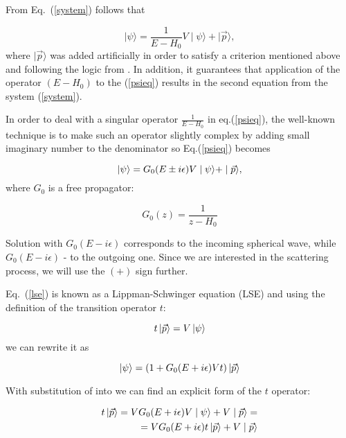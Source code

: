     From Eq.~(\ref{system}) follows that

    \begin{equation}
        \mid \psi \rangle = \frac{1}{E - H_0}V \mid \psi \rangle +  \mid \vec{p} \rangle,
        \label{psieq}
    \end{equation}
    where $\mid \vec{p} \rangle$ was added artificially in order to satisfy a criterion mentioned above 
    and following the logic from \cite{Sakurai}. In addition, it guarantees that
     application of the operator $(E -H_0)$ to the 
    (\ref{psieq}) results in the second equation from the system (\ref{system}).

    In order to deal with a singular operator $\frac{1}{E - H_0}$ in eq.(\ref{psieq}), the well-known
    technique is to make such an operator slightly complex by adding small imaginary number to the denominator
    so Eq.(\ref{psieq}) becomes

    \begin{equation}
        \ket{\psi} = G_0(E \pm i\epsilon)V \mid \psi \rangle +  \mid \vec{p} \rangle,
        \label{lse}
    \end{equation}
    where $G_0$ is a free propagator:

    \begin{equation}
        G_0(z) = \frac{1}{z - H_0}
    \end{equation}

    Solution with $G_0(E - i\epsilon)$ corresponds to the incoming spherical wave,
    while $G_0(E - i\epsilon)$ - to the outgoing one. Since we are interested in the scattering
    process, we will use the $(+)$ sign further.
    
    Eq.~(\ref{lse}) is known as a Lippman-Schwinger equation (LSE) and using
    the definition of the transition operator $t$:

    \begin{equation}
        t \ket{\vec{p}} = V \ket{\psi}
        \label{t-op}
    \end{equation}
    we can rewrite it as 

    \begin{equation}
        \ket{\psi} = (1 + G_0(E + i\epsilon)V t)  \ket {\vec{p}}
    \end{equation}

    With substitution of  into  we can find
    an explicit form of the $t$ operator:

    \begin{eqnarray}
        t \ket{\vec{p}} = V G_0(E + i\epsilon)V \mid \psi \rangle +  V \mid \vec{p} \rangle = \nonumber\\
        = V G_0(E + i\epsilon) t \ket{\vec{p}} +  V \mid \vec{p} \rangle
        \label{top2}
    \end{eqnarray}

